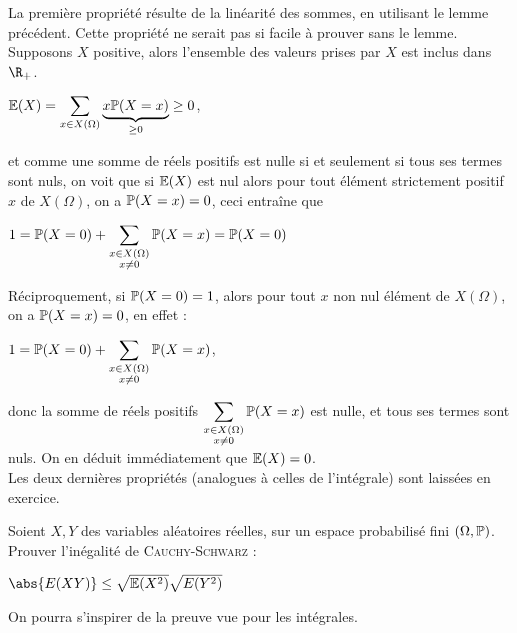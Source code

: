 \documentclass[12pt,a4paper]{report}
\begin{document}
\begin{demo}{}
La première propriété résulte de la linéarité des sommes, en utilisant le lemme précédent. Cette propriété ne serait pas si facile à prouver sans le lemme. \\

Supposons $X$ positive, alors l'ensemble des valeurs prises par $X$ est inclus dans $\R_+$.
\begin{center}
$\mathbb{E}(X) = \displaystyle \sum_{x \in X(\Omega)} \underbrace{x \mathbb{P}(X=x)}_{\ge 0} \ge 0$, 
\end{center}
et comme une somme de réels positifs est nulle si et seulement si tous ses termes sont nuls, on voit que si $\mathbb{E}(X)$ est nul alors pour tout élément strictement positif $x$ de $X(\Omega)$, on a $\mathbb{P}(X=x) = 0$, ceci entraîne que
\begin{center}
$1 = \mathbb{P}(X=0) + \displaystyle \sum_{\substack{x \in X(\Omega) \\ x \ne 0}} \mathbb{P}(X=x) = \mathbb{P}(X=0)$
\end{center}

Réciproquement, si $\mathbb{P}(X=0) = 1$, alors pour tout $x$ non nul élément de $X(\Omega)$, on a $\mathbb{P}(X=x) = 0$, en effet :
\begin{center}
$1 = \mathbb{P}(X=0) + \displaystyle \sum_{\substack{x \in X(\Omega) \\ x \ne 0}} \mathbb{P}(X=x)$,
\end{center}
donc la somme de réels positifs $\displaystyle \sum_{\substack{x \in X(\Omega) \\ x \ne 0}} \mathbb{P}(X=x)$ est nulle, et tous ses termes sont nuls. On en déduit immédiatement que $\mathbb{E}(X) = 0$. \\

Les deux dernières propriétés (analogues à celles de l'intégrale) sont laissées en exercice.
\end{demo}

\begin{exemple}[Exercice 12]{}
Soient $X,Y$ des variables aléatoires réelles, sur un espace probabilisé fini $(\Omega, \mathbb{P})$. Prouver l'inégalité de \textsc{Cauchy-Schwarz} :
\begin{center}
$\abs{E(XY)} \le \sqrt{\E(X^2)}\sqrt{E(Y^2)}$
\end{center}
On pourra s'inspirer de la preuve vue pour les intégrales.
\end{exemple}

	
\end{document}
